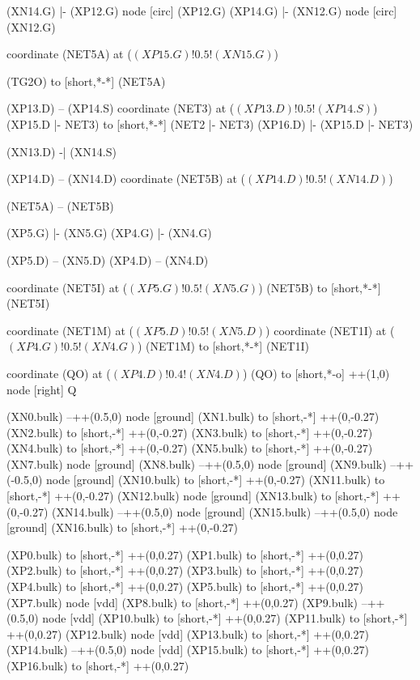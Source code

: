 \begin{circuitikz}[american]
	(XN14.G) |- (XP12.G)
	node [circ] (XP12.G) {}
	(XP14.G) |- (XN12.G)
	node [circ] (XN12.G) {}
	
	coordinate (NET5A) at ($(XP15.G)!0.5!(XN15.G)$)
	
	(TG2O) to [short,*-*] (NET5A)
	
	(XP13.D) -- (XP14.S)
	coordinate (NET3) at ($(XP13.D)!0.5!(XP14.S)$)
	(XP15.D |- NET3) to [short,*-*] (NET2 |- NET3)
	(XP16.D) |- (XP15.D |- NET3)
	
	(XN13.D) -| (XN14.S)
	
	(XP14.D) -- (XN14.D)
	coordinate (NET5B) at ($(XP14.D)!0.5!(XN14.D)$) 
	
	
	(NET5A) -- (NET5B)
	
	(XP5.G) |- (XN5.G) 
	(XP4.G) |- (XN4.G)
	
	(XP5.D) -- (XN5.D)
	(XP4.D) -- (XN4.D) 
	
	coordinate (NET5I) at ($(XP5.G)!0.5!(XN5.G)$)
	(NET5B) to [short,*-*] (NET5I)
	
	coordinate (NET1M) at ($(XP5.D)!0.5!(XN5.D)$) 	
	coordinate (NET1I) at ($(XP4.G)!0.5!(XN4.G)$) 	
	(NET1M) to [short,*-*] (NET1I)
		
	coordinate (QO) at ($(XP4.D)!0.4!(XN4.D)$)
	(QO) to [short,*-o] ++(1,0) node [right] {Q}
	
	(XN0.bulk) --++(0.5,0) node [ground] {}
	(XN1.bulk) to [short,-*] ++(0,-0.27)		
	(XN2.bulk) to [short,-*] ++(0,-0.27)
	(XN3.bulk) to [short,-*] ++(0,-0.27)
	(XN4.bulk) to [short,-*] ++(0,-0.27)
	(XN5.bulk) to [short,-*] ++(0,-0.27)
	(XN7.bulk) node [ground] {}
	(XN8.bulk) --++(0.5,0) node [ground] {}
	(XN9.bulk) --++(-0.5,0) node [ground] {}
	(XN10.bulk) to [short,-*] ++(0,-0.27)
	(XN11.bulk) to [short,-*] ++(0,-0.27)
	(XN12.bulk) node [ground] {}
	(XN13.bulk) to [short,-*] ++(0,-0.27)
	(XN14.bulk) --++(0.5,0) node [ground] {}
	(XN15.bulk) --++(0.5,0) node [ground] {}
	(XN16.bulk) to [short,-*] ++(0,-0.27)
	
	(XP0.bulk) to [short,-*] ++(0,0.27)
	(XP1.bulk) to [short,-*] ++(0,0.27)	
	(XP2.bulk) to [short,-*] ++(0,0.27)
	(XP3.bulk) to [short,-*] ++(0,0.27)	
	(XP4.bulk) to [short,-*] ++(0,0.27)
	(XP5.bulk) to [short,-*] ++(0,0.27)
	(XP7.bulk) node [vdd] {}	
	(XP8.bulk) to [short,-*] ++(0,0.27)
	(XP9.bulk) --++(0.5,0) node [vdd] {}
	(XP10.bulk) to [short,-*] ++(0,0.27)
	(XP11.bulk) to [short,-*] ++(0,0.27)
	(XP12.bulk) node [vdd] {}
	(XP13.bulk) to [short,-*] ++(0,0.27)
	(XP14.bulk) --++(0.5,0) node [vdd] {}
	(XP15.bulk) to [short,-*] ++(0,0.27)
	(XP16.bulk) to [short,-*] ++(0,0.27)	


\end{circuitikz}
